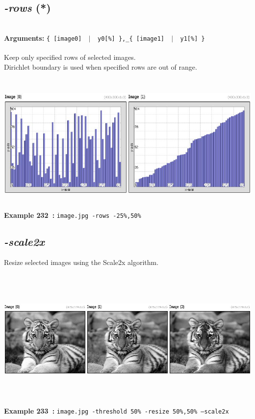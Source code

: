 \documentclass[a4paper,11pt,twoside]{book}
\begin{document}
\subsection{\emph{-rows} (*)}\vspace*{-0.5em}
~\\\textbf{Arguments: } 
{\small \texttt{\{ [image0] ~$|$~ y0[\%] \},\_\{ [image1] ~$|$~ y1[\%] \}}}\\~\\
Keep only specified rows of selected images.
~\\Dirichlet boundary is used when specified rows are out of range.
\begin{center}\includegraphics[keepaspectratio=true,height=7cm,width=\textwidth]{img/gmic_def232.jpg}\\
{\footnotesize \textbf{Example 232~:} \texttt{image.jpg -rows -25\%,50\%}}
\end{center}

\subsection{\emph{-scale2x} }\vspace*{-0.5em}
Resize selected images using the Scale2x algorithm.
\begin{center}\includegraphics[keepaspectratio=true,height=7cm,width=\textwidth]{img/gmic_def233.jpg}\\
{\footnotesize \textbf{Example 233~:} \texttt{image.jpg -threshold 50\% -resize 50\%,50\% --scale2x}}
\end{center}
\end{document}
